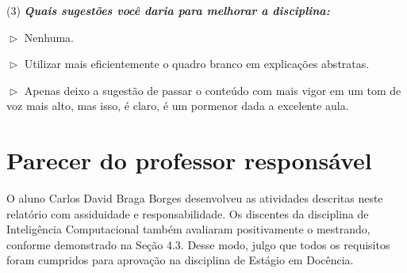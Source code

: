 \documentclass[
	12pt,				%
	openright,			%
	oneside,			%
	a4paper,			%
	chapter=TITLE,		%
	section=TITLE,		%
	english,			%
	french,				%
	spanish,			%
	brazil				%
	]{abntex2}
\begin{document}
(3) \textit{\textbf{Quais sugestões você daria para melhorar a disciplina:}}

$\vartriangleright$ Nenhuma.

$\vartriangleright$ Utilizar mais eficientemente o quadro branco em explicações abstratas.

$\vartriangleright$ Apenas deixo a sugestão de passar o conteúdo com mais vigor em um tom de voz mais alto, mas isso, é claro, é um pormenor dada a excelente aula.

\newpage
\chapter{Parecer do professor responsável}

O aluno Carlos David Braga Borges desenvolveu as atividades descritas neste relatório com assiduidade e responsabilidade. Os discentes da disciplina de Inteligência Computacional também avaliaram positivamente o mestrando, conforme demonstrado na Seção 4.3. Desse modo, julgo que todos os requisitos foram cumpridos para aprovação na disciplina de Estágio em Docência.

\postextual
\newpage


%
%
\end{document}
